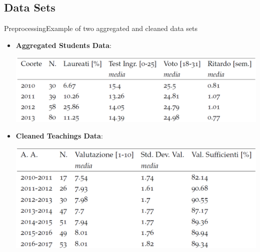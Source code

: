 \subsection{Data Sets}
\begin{frame}{Preprocessing}{Example of two aggregated and cleaned data sets}

\begin{itemize}
    \item<1->\textbf{Aggregated Students Data}:\\
        \noindent\begin{centering}
            \hspace*{1.0cm}\includegraphics[scale=0.175]{img7.png}
        \end{centering}
    \vspace{0.2cm}
    \item<2->\textbf{Cleaned Teachings Data}:\\
        \noindent\begin{centering}
            \hspace*{1.0cm}\includegraphics[scale=0.175]{img6.png}
        \end{centering}
\end{itemize}

\end{frame}

